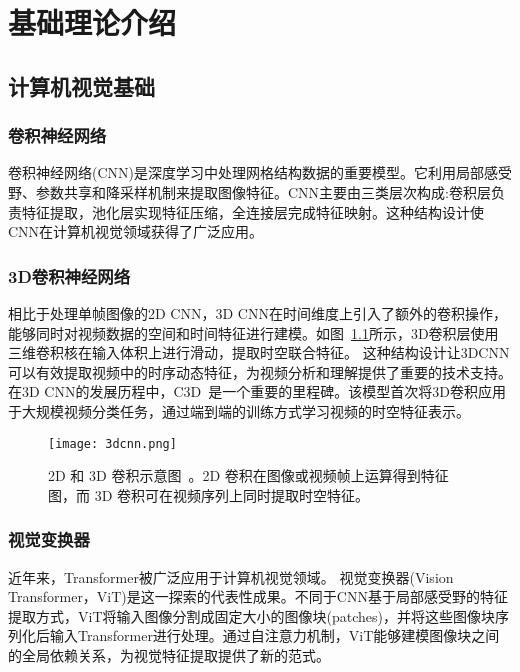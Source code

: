 

\chapter{基础理论介绍}
\label{chap:background}

\section{计算机视觉基础} %

\subsection{卷积神经网络}
卷积神经网络(CNN)是深度学习中处理网格结构数据的重要模型。它利用局部感受野、参数共享和降采样机制来提取图像特征。CNN主要由三类层次构成:卷积层负责特征提取，池化层实现特征压缩，全连接层完成特征映射。这种结构设计使CNN在计算机视觉领域获得了广泛应用。

\subsection{3D卷积神经网络}
相比于处理单帧图像的2D CNN，3D CNN在时间维度上引入了额外的卷积操作，能够同时对视频数据的空间和时间特征进行建模。如图~\ref{fig:3dcnn}所示，3D卷积层使用三维卷积核在输入体积上进行滑动，提取时空联合特征。
这种结构设计让3DCNN可以有效提取视频中的时序动态特征，为视频分析和理解提供了重要的技术支持。
在3D CNN的发展历程中，C3D~\cite{tran2015c3d}是一个重要的里程碑。该模型首次将3D卷积应用于大规模视频分类任务，通过端到端的训练方式学习视频的时空特征表示。
\begin{figure}[htbp]
    \centering
    \texttt{[image: 3dcnn.png]}
    \caption{2D 和 3D 卷积示意图~\cite{tran2015c3d}。2D 卷积在图像或视频帧上运算得到特征图，而 3D 卷积可在视频序列上同时提取时空特征。}
    \label{fig:3dcnn}
\end{figure}

\subsection{视觉变换器}
近年来，Transformer被广泛应用于计算机视觉领域。
视觉变换器(Vision Transformer，ViT)是这一探索的代表性成果。不同于CNN基于局部感受野的特征提取方式，ViT将输入图像分割成固定大小的图像块(patches)，并将这些图像块序列化后输入Transformer进行处理。通过自注意力机制，ViT能够建模图像块之间的全局依赖关系，为视觉特征提取提供了新的范式。

